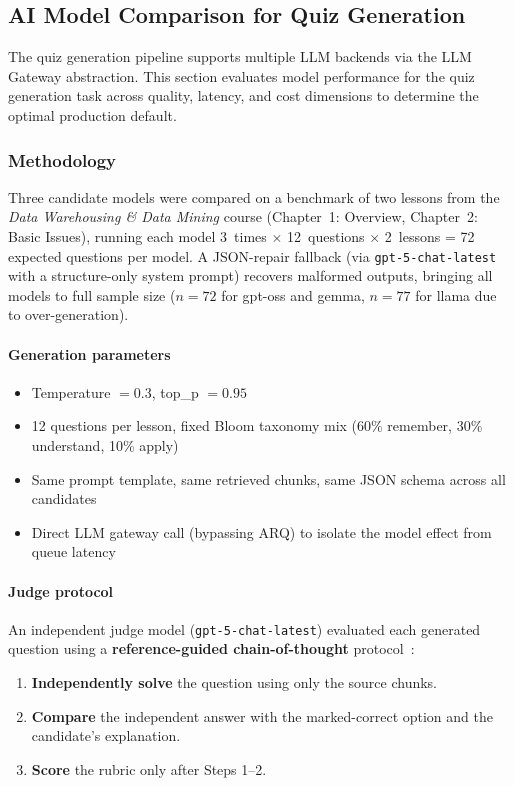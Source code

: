 \subsection{AI Model Comparison for Quiz Generation}
\label{sec:eval_ai_model}

The quiz generation pipeline supports multiple LLM backends via the LLM Gateway abstraction. This section evaluates model performance for the quiz generation task across quality, latency, and cost dimensions to determine the optimal production default.

\subsubsection{Methodology}

Three candidate models were compared on a benchmark of two lessons from the \textit{Data Warehousing \& Data Mining} course (Chapter~1: Overview, Chapter~2: Basic Issues), running each model 3~times $\times$ 12~questions $\times$ 2~lessons = 72 expected questions per model. A JSON-repair fallback (via \texttt{gpt-5-chat-latest} with a structure-only system prompt) recovers malformed outputs, bringing all models to full sample size ($n = 72$ for gpt-oss and gemma, $n = 77$ for llama due to over-generation).

\paragraph{Generation parameters}
\begin{itemize}
    \item Temperature $= 0.3$, top\_p $= 0.95$
    \item 12 questions per lesson, fixed Bloom taxonomy mix (60\% remember, 30\% understand, 10\% apply)
    \item Same prompt template, same retrieved chunks, same JSON schema across all candidates
    \item Direct LLM gateway call (bypassing ARQ) to isolate the model effect from queue latency
\end{itemize}

\paragraph{Judge protocol}
An independent judge model (\texttt{gpt-5-chat-latest}) evaluated each generated question using a \textbf{reference-guided chain-of-thought} protocol~\cite{zheng2023llmjudge}:
\begin{enumerate}
    \item \textbf{Independently solve} the question using only the source chunks.
    \item \textbf{Compare} the independent answer with the marked-correct option and the candidate's explanation.
    \item \textbf{Score} the rubric only after Steps 1--2.
\end{enumerate}

